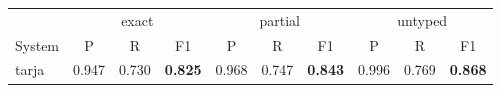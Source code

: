 \begin{tabular}{lccccccccc}
\toprule
 & \multicolumn{3}{c}{exact} & \multicolumn{3}{c}{partial} & \multicolumn{3}{c}{untyped} \\
System & P & R & F1 & P & R & F1 & P & R & F1 \\
\midrule
tarja & 0.947 & 0.730 & \textbf{0.825} & 0.968 & 0.747 & \textbf{0.843} & 0.996 & 0.769 & \textbf{0.868} \\
\bottomrule
\end{tabular}

